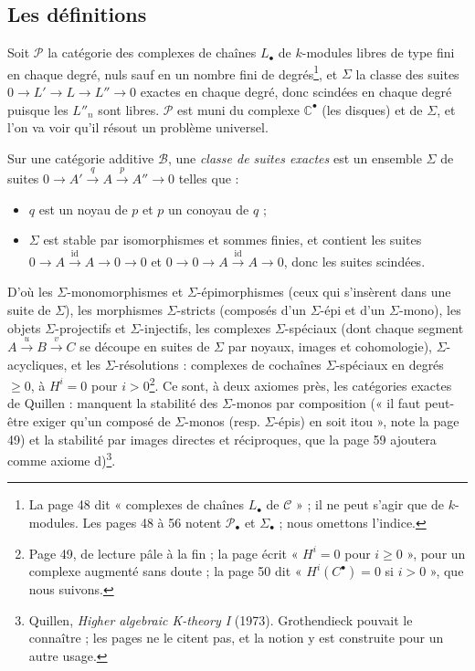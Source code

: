 \documentclass[11pt,a4paper]{article}
\begin{document}
\subsection*{Les définitions}

Soit $\mathcal{P}$ la catégorie des complexes de chaînes $L_{\bullet}$ de
$k$-modules libres de type fini en chaque degré, nuls sauf en un nombre fini
de degrés\footnote{La page 48 dit « complexes de chaînes $L_{\bullet}$ de
$\mathcal{C}$ » ; il ne peut s'agir que de $k$-modules. Les pages 48 à 56
notent $\mathcal{P}_{\bullet}$ et $\Sigma_{\bullet}$ ; nous omettons
l'indice.}, et $\Sigma$ la classe des suites $0 \to L' \to L \to L'' \to 0$
exactes en chaque degré, donc scindées en chaque degré puisque les $L''_{n}$
sont libres. $\mathcal{P}$ est muni du complexe $\mathbb{C}^{\bullet}$ (les
disques) et de $\Sigma$, et l'on va voir qu'il résout un problème universel.

Sur une catégorie additive $\mathcal{B}$, une \emph{classe de suites exactes}
est un ensemble $\Sigma$ de suites $0 \to A' \xrightarrow{q} A
\xrightarrow{p} A'' \to 0$ telles que :
\begin{itemize}
\item[Sex 1)] $q$ est un noyau de $p$ et $p$ un conoyau de $q$ ;
\item[Sex 2)] $\Sigma$ est stable par isomorphismes et sommes finies, et
contient les suites $0 \to A \xrightarrow{\mathrm{id}} A \to 0 \to 0$ et
$0 \to 0 \to A \xrightarrow{\mathrm{id}} A \to 0$, donc les suites scindées.
\end{itemize}
D'où les $\Sigma$-monomorphismes et $\Sigma$-épimorphismes (ceux qui
s'insèrent dans une suite de $\Sigma$), les morphismes $\Sigma$-stricts
(composés d'un $\Sigma$-épi et d'un $\Sigma$-mono), les objets
$\Sigma$-projectifs et $\Sigma$-injectifs, les complexes $\Sigma$-spéciaux
(dont chaque segment $A \xrightarrow{u} B \xrightarrow{v} C$ se découpe en
suites de $\Sigma$ par noyaux, images et cohomologie), $\Sigma$-acycliques,
et les $\Sigma$-résolutions : complexes de cochaînes $\Sigma$-spéciaux en
degrés $\geqslant 0$, à $H^{i} = 0$ pour $i > 0$\footnote{Page 49, de lecture
pâle à la fin ; la page écrit « $H^{i} = 0$ pour $i \geqslant 0$ », pour un
complexe augmenté sans doute ; la page 50 dit « $H^{i}(C^{\bullet}) = 0$ si
$i > 0$ », que nous suivons.}. Ce sont, à deux axiomes près, les catégories
exactes de Quillen : manquent la stabilité des $\Sigma$-monos par
composition (« il faut peut-être exiger qu'un composé de $\Sigma$-monos
(resp. $\Sigma$-épis) en soit itou », note la page 49) et la stabilité par
images directes et réciproques, que la page 59 ajoutera comme axiome
d)\footnote{Quillen, \emph{Higher algebraic K-theory I} (1973). Grothendieck
pouvait le connaître ; les pages ne le citent pas, et la notion y est
construite pour un autre usage.}.
\end{document}

